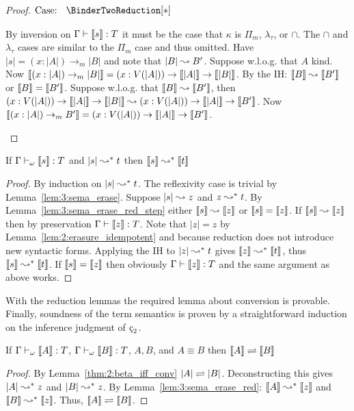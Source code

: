 \begin{proof}
    $\text{Case: }\begin{array}{c} \BinderTwoReduction[*] \end{array}$
    \begin{proofcase}
        By inversion on $\Gamma \vdash \llbracket s \rrbracket : T$ it must be the case that $\kappa$ is $\Pi_m$, $\lambda_\tau$, or $\cap$.
        The $\cap$ and $\lambda_\tau$ cases are similar to the $\Pi_m$ case and thus omitted.
        Have $|s| = (x : |A|) \to_m |B|$ and note that $|B| \leadsto B^\prime$.
        Suppose w.l.o.g. that $A$ kind.
        Now $\llbracket (x : |A|) \to_m |B| \rrbracket = (x : V(|A|)) \to \llbracket |A| \rrbracket \to \llbracket |B| \rrbracket$.
        By the IH: $\llbracket B \rrbracket \leadsto \llbracket B^\prime \rrbracket$ or $\llbracket B \rrbracket = \llbracket B^\prime \rrbracket$.
        Suppose w.l.o.g. that $\llbracket B \rrbracket \leadsto \llbracket B^\prime \rrbracket$, then $(x : V(|A|)) \to \llbracket |A| \rrbracket \to \llbracket |B| \rrbracket \leadsto (x : V(|A|)) \to \llbracket |A| \rrbracket \to \llbracket B^\prime \rrbracket$.
        Now $\llbracket (x : |A|) \to_m B^\prime \rrbracket = (x : V(|A|)) \to \llbracket |A| \rrbracket \to \llbracket B^\prime \rrbracket$.
    \end{proofcase}
\end{proof}

\begin{lemma}
    \label{lem:3:sema_erase_red}
    If $\Gamma \vdash_\omega \llbracket s \rrbracket : T$ and $|s| \leadsto^* t$ then $\llbracket s \rrbracket \leadsto^* \llbracket t \rrbracket$
\end{lemma}
\begin{proof}
    By induction on $|s| \leadsto^* t$.
    The reflexivity case is trivial by Lemma~\ref{lem:3:sema_erase}.
    Suppose $|s| \leadsto z$ and $z \leadsto^* t$.
    By Lemma~\ref{lem:3:sema_erase_red_step} either $\llbracket s \rrbracket \leadsto \llbracket z \rrbracket$ or $\llbracket s \rrbracket = \llbracket z \rrbracket$.
    If $\llbracket s \rrbracket \leadsto \llbracket z \rrbracket$ then by preservation $\Gamma \vdash \llbracket z \rrbracket : T$.
    Note that $|z| = z$ by Lemma~\ref{lem:2:erasure_idempotent} and because reduction does not introduce new syntactic forms.
    Applying the IH to $|z| \leadsto^* t$ gives $\llbracket z \rrbracket \leadsto^* \llbracket t \rrbracket$, thus $\llbracket s \rrbracket \leadsto^* \llbracket t \rrbracket$.
    If $\llbracket s \rrbracket = \llbracket z \rrbracket$ then obviously $\Gamma \vdash \llbracket z \rrbracket : T$ and the same argument as above works.
\end{proof}

With the reduction lemmas the required lemma about conversion is provable.
Finally, soundness of the term semantics is proven by a straightforward induction on the inference judgment of $\ced$.

\begin{lemma}
    \label{lem:3:sema_conv}
    If $\Gamma \vdash_\omega \llbracket A \rrbracket : T$, $\Gamma \vdash_\omega \llbracket B \rrbracket : T$, $A, B$\pseobj, and $A \equiv B$ then $\llbracket A \rrbracket \rightleftharpoons \llbracket B \rrbracket$
\end{lemma}
\begin{proof}
    By Lemma~\ref{thm:2:beta_iff_conv} $|A| \rightleftharpoons |B|$.
    Deconstructing this gives $|A| \leadsto^* z$ and $|B| \leadsto^* z$.
    By Lemma~\ref{lem:3:sema_erase_red}: $\llbracket A \rrbracket \leadsto^* \llbracket z \rrbracket$ and $\llbracket B \rrbracket \leadsto^* \llbracket z \rrbracket$.
    Thus, $\llbracket A \rrbracket \rightleftharpoons \llbracket B \rrbracket$.
\end{proof}

